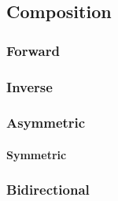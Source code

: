 \subsection{Composition}
\label{sec:composition}

\subsubsection{Forward}
\label{sec:forward}

\subsubsection{Inverse}
\label{sec:inverse}

\subsubsection{Asymmetric}
\label{sec:asymmetric}

\paragraph{Symmetric}
\label{sec:symmetric}

\subsubsection{Bidirectional}
\label{sec:bidirectional}